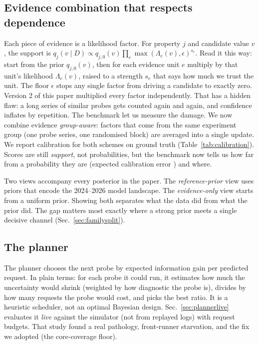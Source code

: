 \subsection{Evidence combination that respects dependence}
\label{sec:grouped}
Each piece of evidence is a likelihood factor.  For property $j$ and candidate value
$v$, the support is
$q_j(v\mid D)\propto q_{j,0}(v)\prod_e\max(\Lambda_e(v),\epsilon)^{s_e}$.
Read it this way: start from the prior $q_{j,0}(v)$, then for each evidence unit $e$
multiply by that unit's likelihood $\Lambda_e(v)$, raised to a strength $s_e$ that says
how much we trust the unit.  The floor $\epsilon$ stops any single factor from driving a
candidate to exactly zero.  Version 2 of this paper multiplied every factor
independently.  That has a hidden flaw: a long series of similar probes gets counted
again and again, and confidence inflates by repetition.  The benchmark let us measure
the damage.  We now combine evidence \emph{group-aware}: factors that come from the same
experiment group (one probe series, one randomised block) are averaged into a single
update.  We report calibration for both schemes on ground truth
(Table~\ref{tab:calibration}).  Scores are still \emph{support}, not probabilities, but
the benchmark now tells us how far from a probability they are (expected calibration
error \BenchECE{}) and where.

Two views accompany every posterior in the paper.  The \emph{reference-prior} view uses
priors that encode the 2024--2026 model landscape.  The \emph{evidence-only} view starts
from a uniform prior.  Showing both separates what the data did from what the prior
did.  The gap matters most exactly where a strong prior meets a single decisive channel
(Sec.~\ref{sec:familysplit}).

\subsection{The planner}
\label{sec:planner}
The planner chooses the next probe by expected information gain per predicted request.
In plain terms: for each probe it could run, it estimates how much the uncertainty
would shrink (weighted by how diagnostic the probe is), divides by how many requests
the probe would cost, and picks the best ratio.  It is a heuristic scheduler, not an
optimal Bayesian design.  Sec.~\ref{sec:plannerlive} evaluates it \emph{live} against
the simulator (not from replayed logs) with request budgets.  That study found a real
pathology, front-runner starvation, and the fix we adopted (the core-coverage floor).
